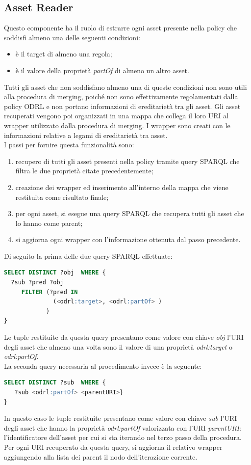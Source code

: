 \documentclass[12pt,a4paper,twoside]{book}
\begin{document}
\subsection{Asset Reader}
Questo componente ha il ruolo di estrarre ogni asset presente nella policy che soddisfi almeno una delle seguenti condizioni:
\begin{itemize}
\item è il target di almeno una regola;
\item è il valore della proprietà \textit{partOf} di almeno un altro asset.
\end{itemize}
Tutti gli asset che non soddisfano almeno una di queste condizioni non sono utili alla procedura di merging, poiché non sono effettivamente regolamentati dalla policy ODRL e non portano informazioni di ereditarietà tra gli asset. Gli asset recuperati vengono poi organizzati in una mappa che collega il loro URI al wrapper utilizzato dalla procedura di merging. I wrapper sono creati con  le informazioni relative a legami di ereditarietà tra asset.\\
I passi per fornire questa funzionalità sono:
\begin{enumerate}
\item recupero di tutti gli asset presenti nella policy tramite query SPARQL che filtra le due proprietà citate precedentemente;
\item creazione dei wrapper ed inserimento all'interno della mappa che viene restituita come risultato finale;
\item per ogni asset, si esegue una query SPARQL che recupera tutti gli asset che lo hanno come parent;
\item si aggiorna ogni wrapper con l'informazione ottenuta dal passo precedente. 
\end{enumerate}
Di seguito la prima delle due query SPARQL effettuate:
\begin{lstlisting}[language=sql,firstnumber=1,caption={Query SPARQL per il recupero degli asset utili alla procedura di merging},captionpos=b,label=parserRuleCode]
SELECT DISTINCT ?obj  WHERE {
  ?sub ?pred ?obj
     FILTER (?pred IN
              (<odrl:target>, <odrl:partOf> )
            ) 
}
\end{lstlisting}
Le tuple restituite da questa query presentano come valore con chiave \textit{obj} l'URI degli asset che almeno una volta sono il valore di una proprietà \textit{odrl:target} o \textit{odrl:partOf}.\\
La seconda query necessaria al procedimento invece è la seguente:
\begin{lstlisting}[language=sql,firstnumber=1,caption={Query SPARQL per il recupero degli asset utili alla procedura di merging},captionpos=b,label=parserRuleCode]
SELECT DISTINCT ?sub  WHERE {
   ?sub <odrl:partOf> <parentURI>}
}
\end{lstlisting}
In questo caso le tuple restituite presentano come valore con chiave \textit{sub} l'URI degli asset che hanno la proprietà \textit{odrl:partOf} valorizzata con l'URI \textit{parentURI}: l'identificatore dell'asset per cui si sta iterando nel terzo passo della procedura.\\
Per ogni URI recuperato da questa query, si aggiorna il relativo wrapper aggiungendo alla lista dei parent il nodo dell'iterazione corrente.
\end{document}
